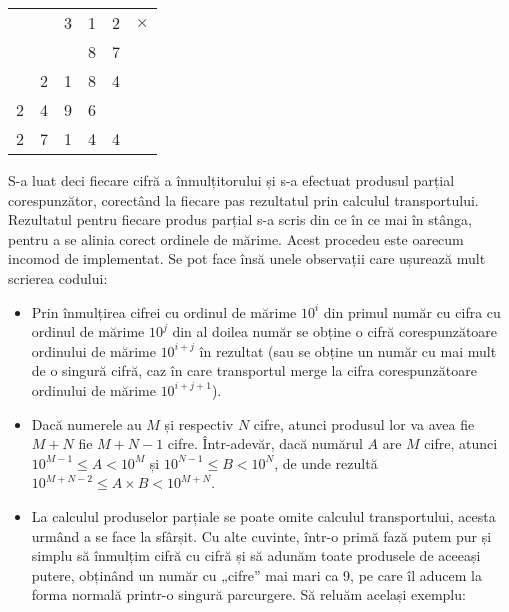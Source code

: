 \begin{center}
  \begin{tabular}{llllll}
    & & 3 & 1 & 2 & $\times$ \\
    & & & 8 & 7 \\ \cline{1-5}
    & 2 & 1 & 8 & 4 \\
    2 & 4 & 9 & 6 & \\ \cline{1-5}
    2 & 7 & 1 & 4 & 4
  \end{tabular}
\end{center}

S-a luat deci fiecare cifră a înmulțitorului și s-a efectuat produsul parțial
corespunzător, corectând la fiecare pas rezultatul prin calculul
transportului. Rezultatul pentru fiecare produs parțial s-a scris din ce în ce
mai în stânga, pentru a se alinia corect ordinele de mărime. Acest procedeu
este oarecum incomod de implementat. Se pot face însă unele observații care
ușurează mult scrierea codului:

\begin{itemize}

\item Prin înmulțirea cifrei cu ordinul de mărime $10^i$ din primul număr cu
  cifra cu ordinul de mărime $10^j$ din al doilea număr se obține o cifră
  corespunzătoare ordinului de mărime $10^{i+j}$ în rezultat (sau se obține un
  număr cu mai mult de o singură cifră, caz în care transportul merge la cifra
  corespunzătoare ordinului de mărime $10^{i + j + 1}$).
      
\item Dacă numerele au $M$ și respectiv $N$ cifre, atunci produsul lor va avea
  fie $M + N$ fie $M + N - 1$ cifre. Într-adevăr, dacă numărul $A$ are $M$
  cifre, atunci $10^{M - 1} \leq A < 10^M$ și $10^{N - 1} \leq B < 10^N$, de
  unde rezultă $10^{M + N - 2} \leq A \times B < 10^{M + N}$.

\item La calculul produselor parțiale se poate omite calculul transportului,
  acesta urmând a se face la sfârșit. Cu alte cuvinte, într-o primă fază putem
  pur și simplu să înmulțim cifră cu cifră și să adunăm toate produsele de
  aceeași putere, obținând un număr cu „cifre” mai mari ca 9, pe care îl
  aducem la forma normală printr-o singură parcurgere. Să reluăm același
  exemplu:

\end{itemize}


